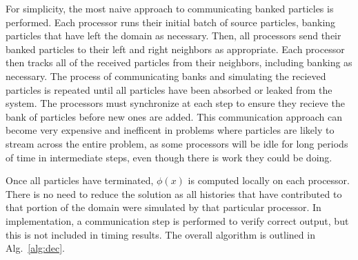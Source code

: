 \documentclass[12pt]{article}
\begin{document}
{{For simplicity, the most naive approach to communicating banked particles is
performed.  Each processor runs their initial batch of source particles, banking
particles that have left the domain as necessary.  Then, all processors send their
banked particles to their left and right neighbors as appropriate. Each processor
then tracks all of the received particles from their neighbors, including banking as
necessary.  The process of communicating banks and simulating the recieved particles
is repeated until all particles have been absorbed or leaked from the system.  The
processors must synchronize at each step to ensure they recieve the bank of particles
before new ones are added.  This communication approach can become very expensive and
inefficent in problems where particles are likely to stream across the entire
problem, as some processors will be idle for long periods of time in intermediate
steps, even though there is work they could be doing. 

Once all particles have terminated, $\phi(x)$ is computed locally on each processor.
There is no need to reduce the solution as all histories that have contributed to
that portion of the domain were simulated by that particular processor.  In
implementation, a communication step is performed to verify correct output, but this
is not included in timing results. The overall algorithm is
outlined in Alg.~\ref{alg:dec}.

}}
\end{document}

